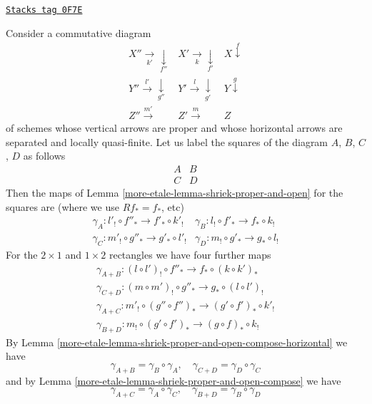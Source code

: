 \begin{remark}
\label{more-etale-remark-going-around}
\href{https://stacks.math.columbia.edu/tag/0F7E}{\texttt{Stacks tag 0F7E}}

Consider a commutative diagram
$$
\begin{array}{ccc}X'' \underset{k'}{\longrightarrow}\underset{f''}{\downarrow} & X' \underset{k}{\longrightarrow}\underset{f'}{\downarrow} & X \overset{f}{\downarrow} \\ Y'' \overset{l'}{\longrightarrow}\underset{g''}{\downarrow} & Y' \overset{l}{\longrightarrow}\underset{g'}{\downarrow} & Y \overset{g}{\downarrow} \\ Z'' \overset{m'}{\longrightarrow} & Z' \overset{m}{\longrightarrow} & Z\end{array}
$$
of schemes whose vertical arrows are proper and whose horizontal
arrows are separated and locally quasi-finite.
Let us label the squares of the diagram $A$, $B$, $C$, $D$
as follows
$$
\begin{matrix}
A & B \\
C & D
\end{matrix}
$$
Then the maps of Lemma \ref{more-etale-lemma-shriek-proper-and-open}
for the squares are (where we use $Rf_* = f_*$, etc)
$$
\begin{matrix}
\gamma_A : l'_! \circ f''_* \to f'_* \circ k'_! &
\gamma_B : l_! \circ f'_* \to f_* \circ k_! \\
\gamma_C : m'_! \circ g''_* \to g'_* \circ l'_! &
\gamma_D : m_! \circ g'_* \to g_* \circ l_!
\end{matrix}
$$
For the $2 \times 1$ and $1 \times 2$ rectangles we have four further
maps
$$
\begin{matrix}
\gamma_{A + B} :
(l \circ l')_! \circ f''_* \to f_* \circ (k \circ k')_*  \\
\gamma_{C + D} :
(m \circ m')_! \circ g''_* \to g_* \circ (l \circ l')_! \\
\gamma_{A + C} :
m'_! \circ (g'' \circ f'')_* \to (g' \circ f')_* \circ k'_! \\
\gamma_{B + D} :
m_! \circ (g' \circ f')_* \to (g \circ f)_* \circ k_!
\end{matrix}
$$
By Lemma \ref{more-etale-lemma-shriek-proper-and-open-compose-horizontal} we have
$$
\gamma_{A + B} = \gamma_B \circ \gamma_A, \quad
\gamma_{C + D} = \gamma_D \circ \gamma_C
$$
and by Lemma \ref{more-etale-lemma-shriek-proper-and-open-compose} we have
$$
\gamma_{A + C} = \gamma_A \circ \gamma_C, \quad
\gamma_{B + D} = \gamma_B \circ \gamma_D
$$
\end{remark}
